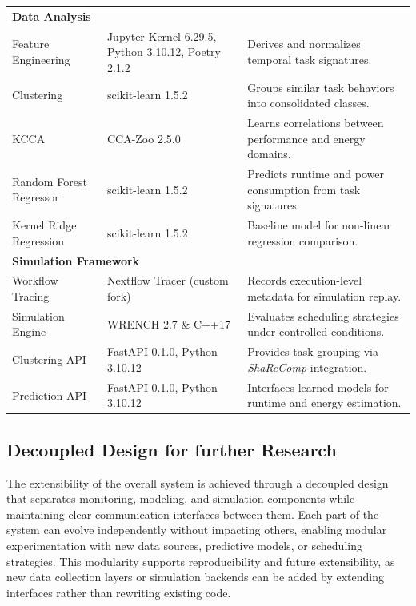 \begin{table}[H]
{\begin{tabular}{
            p{4.5cm}
            >{\centering\arraybackslash}p{2.8cm}
            p{8.2cm}
        }
            \midrule
            \multicolumn{3}{l}{\textbf{Data Analysis}} \\[3pt]
            Feature Engineering & Jupyter Kernel 6.29.5, Python 3.10.12, Poetry 2.1.2 & Derives and normalizes temporal task signatures. \\
            Clustering & scikit-learn 1.5.2 & Groups similar task behaviors into consolidated classes. \\
            KCCA & CCA-Zoo 2.5.0 & Learns correlations between performance and energy domains. \\
            Random Forest Regressor & scikit-learn 1.5.2 & Predicts runtime and power consumption from task signatures. \\
            Kernel Ridge Regression & scikit-learn 1.5.2 & Baseline model for non-linear regression comparison. \\

            \midrule
            \multicolumn{3}{l}{\textbf{Simulation Framework}} \\[3pt]
            Workflow Tracing & Nextflow Tracer (custom fork) & Records execution-level metadata for simulation replay. \\
            Simulation Engine & WRENCH 2.7 \& C++17 & Evaluates scheduling strategies under controlled conditions. \\
            Clustering API & FastAPI 0.1.0, Python 3.10.12 & Provides task grouping via \textit{ShaReComp} integration. \\
            Prediction API & FastAPI 0.1.0, Python 3.10.12 & Interfaces learned models for runtime and energy estimation. \\

            \bottomrule
        \end{tabular}
    }
\end{table}


\subsection{Decoupled Design for further Research}
\label{sec:extensibility_through_decoupled_design}
The extensibility of the overall system is achieved through a decoupled design that separates monitoring, modeling, and simulation components while maintaining clear communication interfaces between them. Each part of the system can evolve independently without impacting others, enabling modular experimentation with new data sources, predictive models, or scheduling strategies. This modularity supports reproducibility and future extensibility, as new data collection layers or simulation backends can be added by extending interfaces rather than rewriting existing code.


